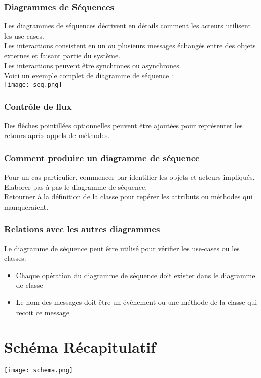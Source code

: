 \documentclass{report}
\begin{document}
		\subsection{Diagrammes de Séquences}

			Les diagrammes de séquences décrivent en détails comment les acteurs utilisent les use-cases.\\
			Les interactions consistent en un ou plusieurs messages échangés entre des objets externes et faisant partie du système.\\
			Les interactions peuvent être synchrones ou asynchrones.\\

			Voici un exemple complet de diagramme de séquence : \\

			\texttt{[image: seq.png]}\\

		\subsection{Contrôle de flux}

			Des flêches pointillées optionnelles peuvent être ajoutées pour représenter les retours après appels de méthodes.\\

		\subsection{Comment produire un diagramme de séquence}

			Pour un cas particulier, commencer par identifier les objets et acteurs impliqués.\\

			Elaborer pas à pas le diagramme de séquence.\\

			Retourner à la définition de la classe pour repérer les attributs ou méthodes qui manqueraient.\\

		\subsection{Relations avec les autres diagrammes}

			Le diagramme de séquence peut être utilisé pour vérifier les use-cases ou les classes.\\

		 	\begin{itemize}
		 		\item Chaque opération du diagramme de séquence doit exister dans le diagramme de classe
		 		\item Le nom des messages doit être un évènement ou une méthode de la classe qui recoit ce message\\
		 	\end{itemize}

\chapter{Schéma Récapitulatif}

	\texttt{[image: schema.png]}
\end{document}
